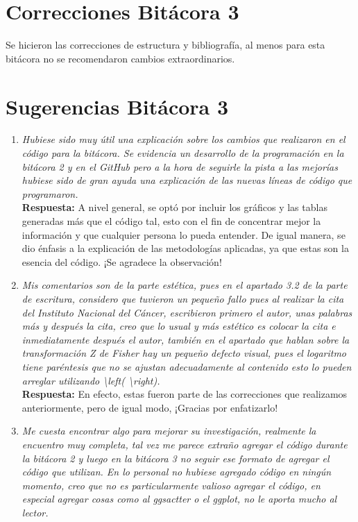 \section{Correcciones Bitácora 3}
Se hicieron las correcciones de estructura y bibliografía, al menos para esta bitácora no se recomendaron cambios extraordinarios.

\section{Sugerencias Bitácora 3}

\begin{enumerate}

    \item \textit{Hubiese sido muy útil una explicación sobre los cambios que realizaron en el código para la bitácora. Se evidencia un desarrollo de la programación en la bitácora 2 y en el GitHub pero a la hora de seguirle la pista a las mejorías hubiese sido de gran ayuda una explicación de las nuevas líneas de código que programaron.}\\

    \textbf{Respuesta:} A nivel general, se optó por incluir los gráficos y las tablas generadas más que el código tal, esto con el fin de concentrar mejor la información y que cualquier persona lo pueda entender. De igual manera, se dio énfasis a la explicación de las metodologías aplicadas, ya que estas son la esencia del código. ¡Se agradece la observación!
    
    \item \textit{Mis comentarios son de la parte estética, pues en el apartado 3.2 de la parte de escritura, considero que tuvieron un pequeño fallo pues al realizar la cita del Instituto Nacional del Cáncer, escribieron primero el autor, unas palabras más y después la cita, creo que lo usual y más estético es colocar la cita e inmediatamente después el autor, también en el apartado que hablan sobre la transformación Z de Fisher hay un pequeño defecto visual, pues el logaritmo tiene paréntesis que no se ajustan adecuadamente al contenido esto lo pueden arreglar utilizando \textbackslash{}left( \textbackslash{}right).}\\

    \textbf{Respuesta:} En efecto, estas fueron parte de las correcciones que realizamos anteriormente, pero de igual modo, ¡Gracias por enfatizarlo!

    \item \textit{Me cuesta encontrar algo para mejorar su investigación, realmente la encuentro muy completa, tal vez me parece extraño agregar el código durante la bitácora 2 y luego en la bitácora 3 no seguir ese formato de agregar el código que utilizan. En lo personal no hubiese agregado código en ningún momento, creo que no es particularmente valioso agregar el código, en especial agregar cosas como al ggsactter o el ggplot, no le aporta mucho al lector.}\\


\end{enumerate}
